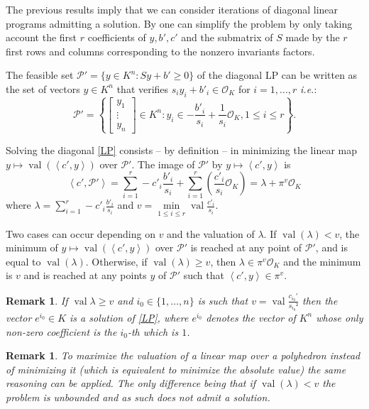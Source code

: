 \documentclass[a4paper,12pt]{article}
\newtheorem{remark}[theorem]{Remark}
\newcommand{\PP}{\mathcal{P}}
\DeclareMathOperator{\val}{val}
\newcommand{\OK}{\mathcal{O}_K}
\begin{document}
The previous results imply that we can consider iterations of diagonal linear programs admitting a solution. By  one can simplify the problem by only taking account the first $r$ coefficients of $y, b', c'$ and the submatrix of $S$ made by the $r$ first rows and columns corresponding to the nonzero invariants factors.

The feasible set $\PP' = \{y \in K^n : Sy+b' \geq 0\}$ of the diagonal LP can be written as the set of vectors
$y \in K^n$ that verifies $s_i y_i + b'_i \in \OK$ for $i=1,...,r$ {\it i.e.}:
$$
\PP' = \left\{\left[\begin{smallmatrix} y_1\\ \vdots\\ y_n \end{smallmatrix}\right] \in K^n :
y_i \in -\frac{b'_i}{s_i} + \frac{1}{s_i} \OK, 1\le i\le r\right\}.
$$

Solving the diagonal \eqref{LP} consists -- by definition -- in minimizing the linear map $y \mapsto \val\left(\left\langle
c',y \right\rangle\right)$ over $\PP'$. The image of $\PP'$ by $y \mapsto \left\langle c',y \right\rangle$ is
\[
\left\langle c',\PP' \right\rangle = \sum_{i=1}^r -c'_i \frac{b'_i}{s_i} + \sum_{i=1}^r\left( \frac{c'_i}{s_{i}} \OK \right) = \lambda + \pi^{v} \OK
\]
where $\lambda = \sum_{i=1}^r -c'_i \frac{b'_i}{s_i}$ and $v = \min\limits_{1\le i\le r} \val \frac{c'_{i}}{s_{i}} $.

Two cases can occur depending on $v$ and the valuation of $\lambda$.
If $\val(\lambda) < v$, the minimum of $y\mapsto \val\left(\left\langle c',y \right\rangle\right)$ over $\PP'$
  is reached at any point of $\PP'$, and is equal to $\val(\lambda)$.
  Otherwise, if $\val(\lambda) \ge v$, then $\lambda \in \pi^{v} \OK$ and the minimum is $v$ and is reached at any points $y$
  of $\PP'$ such that $\left<c',y \right> \in \pi^v$.

\begin{remark}
	If $\val \lambda \ge v$ and $i_0 \in \{1,\ldots, n\} $ is such that $v = \val \frac{c_{i_0}'}{s_{i_0}²} $ 
  then the vector $e^{i_0} \in K$ is a solution of \ref{LP}, 
  where $e^{i_0}$ denotes the vector of $K^n$ whose only non-zero coefficient is the $i_0$-th which is $1$.
\end{remark}

\begin{remark}
To maximize the valuation of a linear map over a polyhedron instead of minimizing it 
(which is equivalent to minimize the absolute value) the same reasoning can be applied. 
The only difference being that if $\val\left( \lambda\right) < v$ the problem is unbounded and 
as such does not admit a solution. 
\end{remark}
\end{document}

